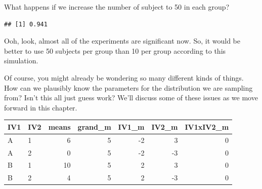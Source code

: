 \documentclass[
]{book}
\newenvironment{Shaded}{\begin{snugshade}}{\end{snugshade}}
\newcommand{\AttributeTok}[1]{\textcolor[rgb]{0.13,0.29,0.53}{#1}}
\newcommand{\ConstantTok}[1]{\textcolor[rgb]{0.56,0.35,0.01}{#1}}
\newcommand{\ControlFlowTok}[1]{\textcolor[rgb]{0.13,0.29,0.53}{\textbf{#1}}}
\newcommand{\DecValTok}[1]{\textcolor[rgb]{0.00,0.00,0.81}{#1}}
\newcommand{\FloatTok}[1]{\textcolor[rgb]{0.00,0.00,0.81}{#1}}
\newcommand{\FunctionTok}[1]{\textcolor[rgb]{0.13,0.29,0.53}{\textbf{#1}}}
\newcommand{\NormalTok}[1]{#1}
\newcommand{\OtherTok}[1]{\textcolor[rgb]{0.56,0.35,0.01}{#1}}
\newcommand{\SpecialCharTok}[1]{\textcolor[rgb]{0.81,0.36,0.00}{\textbf{#1}}}
\begin{document}
What happens if we increase the number of subject to 50 in each group?

\begin{Shaded}
\end{Shaded}

\begin{verbatim}
## [1] 0.941
\end{verbatim}

Ooh, look, almost all of the experiments are significant now. So, it would be better to use 50 subjects per group than 10 per group according to this simulation.

Of course, you might already be wondering so many different kinds of things. How can we plausibly know the parameters for the distribution we are sampling from? Isn't this all just guess work? We'll discuss some of these issues as we move forward in this chapter.

\begin{tabular}{l|l|r|r|r|r|r}
\hline
IV1 & IV2 & means & grand\_m & IV1\_m & IV2\_m & IV1xIV2\_m\\
\hline
A & 1 & 6 & 5 & -2 & 3 & 0\\
\hline
A & 2 & 0 & 5 & -2 & -3 & 0\\
\hline
B & 1 & 10 & 5 & 2 & 3 & 0\\
\hline
B & 2 & 4 & 5 & 2 & -3 & 0\\
\hline
\end{tabular}
\end{document}
